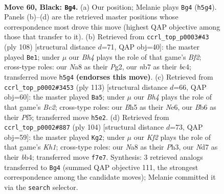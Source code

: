 \documentclass[11pt]{article}
\begin{document}
\clearpage

\begin{figure}[p]\centering
\begin{subfigure}{0.46\textwidth}\centering
\resizebox{\linewidth}{!}{%
\newchessgame
\chessboard[
  setfen={n7/1N1n1k2/1b5B/p2p3b/8/PP2P2p/4P3/3B2K1 b - - 2 60},
  showmover=false,
  pgfstyle=straightmove, color=movearrow, markmove={h5-g4}
]}
\caption{}
\end{subfigure}\hfill
\begin{subfigure}{0.46\textwidth}\centering
\resizebox{\linewidth}{!}{%
\newchessgame
\chessboard[
  setfen={6k1/1B3p2/Pb4pK/2p1P2p/2b4P/8/5BP1/8 w - - 13 55},
  showmover=false,
  pgfstyle=straightmove, color=movearrow, markmove={f2-e1}
]}
\caption{}
\end{subfigure}
\\[4pt]
\begin{subfigure}{0.46\textwidth}\centering
\resizebox{\linewidth}{!}{%
\newchessgame
\chessboard[
  setfen={8/2b5/p3np2/5p1k/1NP2P2/6K1/3B3P/8 b - - 8 57},
  showmover=false,
  pgfstyle=straightmove, color=movearrow, markmove={c7-a5}
]}
\caption{}
\end{subfigure}\hfill
\begin{subfigure}{0.46\textwidth}\centering
\resizebox{\linewidth}{!}{%
\newchessgame
\chessboard[
  setfen={5r1k/2R3p1/7p/p3B2n/1bN5/1P3P1P/8/7K w - - 1 53},
  showmover=false,
  pgfstyle=straightmove, color=movearrow, markmove={h1-g2}
]}
\caption{}
\end{subfigure}
\caption{\textbf{Move 60, Black: \texttt{Bg4}.} (a) Our position; Melanie plays \texttt{Bg4} (\texttt{h5g4}). Panels (b)--(d) are the retrieved master positions whose correspondence most drove this move (highest QAP objective among those that transfer to it). (b) Retrieved from \texttt{ccrl\_top\_p0003\#43} (ply 108) [structural distance $d$=71, QAP obj=40]: the master played \texttt{Be1}; under $\mu$ our \emph{Bh4} plays the role of that game's \emph{Bf2}; cross-type roles: our \emph{N}a8 as their \emph{P}g2, our \emph{n}b7 as their \emph{b}c4; transferred move \texttt{h5g4} \textbf{(endorses this move)}. (c) Retrieved from \texttt{ccrl\_top\_p0002\#3453} (ply 113) [structural distance $d$=66, QAP obj=60]: the master played \texttt{Ba5}; under $\mu$ our \emph{Bh4} plays the role of that game's \emph{Bc2}; cross-type roles: our \emph{B}h5 as their \emph{N}e6, our \emph{B}b6 as their \emph{P}f5; transferred move \texttt{h5e2}. (d) Retrieved from \texttt{ccrl\_top\_p0002\#887} (ply 104) [structural distance $d$=73, QAP obj=59]: the master played \texttt{Kg2}; under $\mu$ our \emph{Kf2} plays the role of that game's \emph{Kh1}; cross-type roles: our \emph{N}a8 as their \emph{P}h3, our \emph{N}d7 as their \emph{b}b4; transferred move \texttt{f7e7}. Synthesis: 3 retrieved analogs transferred to \texttt{Bg4} (summed QAP objective 111, the strongest correspondence among the candidate moves); Melanie committed it via the \texttt{search} selector.}
\label{fig:thought-m119}
\end{figure}
\end{document}
